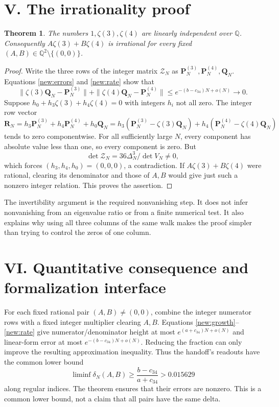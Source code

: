 \documentclass[11pt]{article}
\newtheorem{theorem}{Theorem}
\newcommand{\Q}{\mathbb Q}
\begin{document}
\section*{V. The irrationality proof}
\begin{theorem}\label{new:main}
The numbers $1,\zeta(3),\zeta(4)$ are linearly independent over $\Q$.
Consequently $A\zeta(3)+B\zeta(4)$ is irrational for every fixed
$(A,B)\in\Q^2\setminus\{(0,0)\}$.
\end{theorem}
\begin{proof}
Write the three rows of the integer matrix $\mathcal Z_N$ as
$\mathbf P_N^{(3)},\mathbf P_N^{(4)},\mathbf Q_N$.
Equations \eqref{new:errors} and \eqref{new:rate} show that
\[
 \|\zeta(3)\mathbf Q_N-\mathbf P_N^{(3)}\|
 +\|\zeta(4)\mathbf Q_N-\mathbf P_N^{(4)}\|
 \le e^{-(b-c_{34})N+o(N)}\longrightarrow0.
\]
Suppose $h_0+h_3\zeta(3)+h_4\zeta(4)=0$ with integers $h_i$ not all zero.
The integer row vector
\[
 \mathbf R_N=h_3\mathbf P_N^{(3)}+h_4\mathbf P_N^{(4)}+h_0\mathbf Q_N
 =h_3(\mathbf P_N^{(3)}-\zeta(3)\mathbf Q_N)
  +h_4(\mathbf P_N^{(4)}-\zeta(4)\mathbf Q_N)
\]
tends to zero componentwise. For all sufficiently large $N$, every component
has absolute value less than one, so every component is zero. But
\[
 \det\mathcal Z_N=36\Delta_N^3/\det V_N\ne0,
\]
which forces $(h_3,h_4,h_0)=(0,0,0)$, a contradiction.
If $A\zeta(3)+B\zeta(4)$ were rational, clearing its denominator and those
of $A,B$ would give just such a nonzero integer relation. This proves the
assertion.
\end{proof}

\noindent The invertibility argument is the required nonvanishing step.
It does not infer nonvanishing from an eigenvalue ratio or from a finite
numerical test. It also explains why using all three columns of the same
walk makes the proof simpler than trying to control the zeros of one column.

\section*{VI. Quantitative consequence and formalization interface}
For each fixed rational pair $(A,B)\ne(0,0)$, combine the integer numerator
rows with a fixed integer multiplier clearing $A,B$. Equations
\eqref{new:growth}--\eqref{new:rate} give numerator/denominator height at most
$e^{(a+c_{34})N+o(N)}$ and linear-form error at most
$e^{-(b-c_{34})N+o(N)}$. Reducing the fraction can only improve the resulting
approximation inequality. Thus the handoff's readouts have the common lower
bound
\[
 \liminf\delta_N(A,B)\ge\frac{b-c_{34}}{a+c_{34}}>0.015629
\]
along regular indices. The theorem ensures that their errors are nonzero.
This is a common lower bound, not a claim that all pairs have the same delta.
\end{document}
